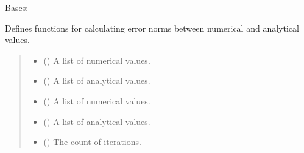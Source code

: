 \documentclass[a4paper,11pt,english,openany]{sphinxmanual}
\begin{document}
\begin{fulllineitems}
\label{\detokenize{api/spyice.utils.error_norms:src.spyice.utils.error_norms.ErrorNorms}}
\pysigstartsignatures
\pysigline
{}
\pysigstopsignatures
\sphinxAtStartPar
Bases: 

\sphinxAtStartPar
Defines functions for calculating error norms between numerical and analytical values.
\begin{quote}\begin{description}
\begin{itemize}
\item {} 
\sphinxAtStartPar
{} () \textendash{} A list of numerical values.

\item {} 
\sphinxAtStartPar
{} () \textendash{} A list of analytical values.

\end{itemize}

\begin{itemize}
\item {} 
\sphinxAtStartPar
{} () \textendash{} A list of numerical values.

\item {} 
\sphinxAtStartPar
{} () \textendash{} A list of analytical values.

\item {} 
\sphinxAtStartPar
{} () \textendash{} The count of iterations.

\end{itemize}

\end{description}\end{quote}


\end{fulllineitems}
\end{document}
